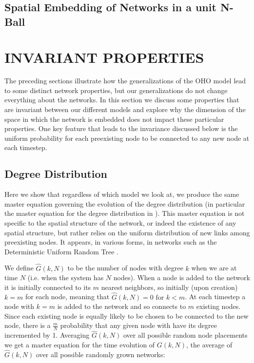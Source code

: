 \documentclass[aps,pre,reprint,superscriptaddress,amsmath,amssymb]{revtex4-1}
\begin{document}
\subsection{Spatial Embedding of Networks in a unit N-Ball}


\section{INVARIANT PROPERTIES}
The preceding sections illustrate how the generalizations of the OHO model lead to some distinct network properties, but our generalizations do not change everything about the networks.
In this section we discuss some properties that are invariant between our different models and explore why the dimension of the space in which the network is embedded does not impact these particular properties.
One key feature that leads to the invariance discussed below is the uniform probability for each preexisting node to be connected to any new node at each timestep. 

\subsection{Degree Distribution}
Here we show that regardless of which model we look at, we produce the same master equation governing the evolution of the degree distribution (in particular the master equation for the degree distribution in \cite{ozik2004}).  This master equation is not specific to the spatial structure of the network, or indeed the existence of any spatial structure, but rather relies on the uniform distribution of new links among preexisting nodes.  It appears, in various forms, in networks such as the Deterministic Uniform Random Tree \cite{zhang2008topologies}.

We define $\hat{G}(k,N)$ to be the number of nodes with degree $k$ when we are at time $N$ (i.e. when the system has $N$ nodes).
When a node is added to the network it is initially connected to its $m$ nearest neighbors, so initially (upon creation) $k = m$ for each node, meaning that $\hat{G}(k,N) = 0 \text{ for } k < m$.
At each timestep a node with $k = m$ is added to the network and so connects to $m$ existing nodes.
Since each existing node is equally likely to be chosen to be connected to the new node, there is a $\frac{m}{N}$ probability that any given node with have its degree incremented by 1.
Averaging $\hat{G}(k,N)$ over all possible random node placements we get a master equation for the time evolution of $G(k,N)$, the average of $\hat{G}(k,N)$ over all possible randomly grown networks:
\end{document}
